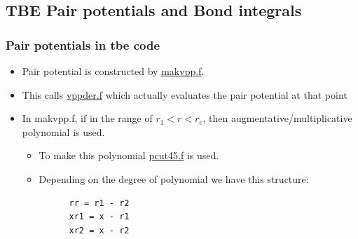 \documentclass[11pt]{article}
\begin{document}
\subsection{TBE Pair potentials and Bond integrals}
\label{sec:org99a1181}
\subsubsection{Pair potentials in tbe code}
\label{sec:orge03d815}
\begin{itemize}
\item Pair potential is constructed by \href{file:///home/tigany/lm/tb/makvpp.f}{makvpp.f}.
\item This calls \href{file:///home/tigany/lm/tb/vppder.f}{vppder.f} which actually evaluates the pair potential at that
point
\item In makvpp.f, if in the range of \(r_1 < r < r_{\text{c}}\), then
augmentative/multiplicative polynomial is used.
\begin{itemize}
\item To make this polynomial \href{file:///home/tigany/lm/tb/pcut45.f}{pcut45.f} is used.
\item Depending on the degree of polynomial we have this structure:
\begin{verbatim}
      rr = r1 - r2
      xr1 = x - r1
      xr2 = x - r2


\end{verbatim}
\end{itemize}
\end{itemize}
\end{document}
